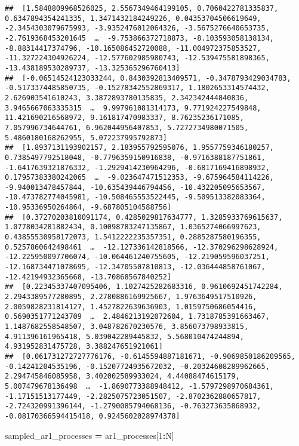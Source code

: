 \documentclass[
]{article}
\newenvironment{Shaded}{\begin{snugshade}}{\end{snugshade}}
\newcommand{\FloatTok}[1]{\textcolor[rgb]{0.00,0.00,0.81}{#1}}
\newcommand{\NormalTok}[1]{#1}
\newcommand{\OperatorTok}[1]{\textcolor[rgb]{0.81,0.36,0.00}{\textbf{#1}}}
\begin{document}
\begin{verbatim}
##  [1.5848809968526025, 2.5567349464199105, 0.7060422781335837, 0.6347894354241335, 1.3471432184249226, 0.04353704506619649, -2.3454303079675993, -3.9352476012064326, -3.5675276640653735, -2.7619368453201645  …  -9.753866372718873, -8.103593058138134, -8.88314417374796, -10.165086452720088, -11.004972375853527, -11.327224304926224, -12.577602985980743, -12.539475581898365, -13.438189530289737, -13.325365296760413]
##  [-0.06514524123033244, 0.8430392813409571, -0.3478793429034783, -0.5173374485850735, -0.15278342552869317, 1.1802653314574432, 2.626903541610243, 3.3872893780135835, 2.342342444840836, 3.9465667063335315  …  9.997961081314173, 9.771924227549848, 11.421690216568972, 9.161817470983337, 8.76235236171085, 7.057996734644761, 6.962044956407853, 5.7272734980071505, 5.4860180168262955, 5.072237995792873]
##  [1.8937131193902157, 2.183955792595076, 1.9557759346180257, 0.7385497792518048, -0.7796359150916838, -0.9716388187751861, -1.6417639321876332, -1.2929414230964296, -0.6817169416898932, 0.17957383380242065  …  -9.023647471512353, -9.675964584114226, -9.940013478457844, -10.635439446794456, -10.432205095653567, -10.473782774045981, -10.508465553522445, -9.509513382083364, -10.95336950264864, -9.687805104588756]
##  [0.37270203810091174, 0.4285029817634777, 1.3285933769615637, 1.0778034281882434, 0.10098783247135867, 1.0365274066997623, 0.43855530958172073, 1.5412222235357351, 0.2885287580196355, 0.5257860642498461  …  -12.127336142818566, -12.370296298628924, -12.225950097706074, -10.064461240755605, -12.219059596037251, -12.168734471078695, -12.34705507810813, -12.036444858761067, -12.42194932365668, -13.70868567840252]
##  [0.22345337407095406, 1.1027425282683316, 0.9610692451742284, 2.2943389577280895, 2.2780886169925667, 1.9763649517510926, 2.0059828231814127, 1.4527822639636903, 1.0159750686054416, 0.5690351771243709  …  2.4846213192072604, 1.7318785391663467, 1.1487682558548507, 3.048782670230576, 3.856073798933815, 4.911396161965418, 5.039042289445832, 5.568010474244894, 4.931952831475728, 3.388247651921061]
##  [0.061731272727776176, -0.6145594887181671, -0.9069850186209565, -0.14241204535196, -0.15207724935672032, -0.20324608289962665, 2.294745846085958, 3.402002589933024, 4.44088474615179, 5.007479678136498  …  -1.8690773388948412, -1.5797298970684361, -1.17151513177449, -2.2825075723051507, -2.8702362880657817, -2.724320991396144, -1.2790085794068136, -0.763273635868932, -0.08170366594415418, 0.9245602028974378]
\end{verbatim}

\begin{Shaded}
\begin{Highlighting}[]
\NormalTok{sampled\_ar1\_processes }\OperatorTok{=}\NormalTok{ ar1\_processes[}\FloatTok{1}\OperatorTok{:}\NormalTok{N]}
\end{Highlighting}
\end{Shaded}
\end{document}
